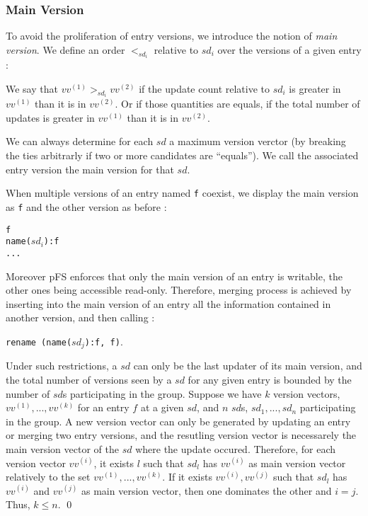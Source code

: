\subsubsection{Main Version}

To avoid the proliferation of entry versions, we introduce the notion
of \emph{main version}. We define an order $<_{sd_{i}}$ relative to
$sd_{i}$ over the versions of a given entry :

\begin{definition}
We say that $vv^{(1)} >_{sd_{i}} vv^{(2)}$ if the update count
relative to $sd_{i}$ is greater in $vv^{(1)}$ than it is in
$vv^{(2)}$. Or if those quantities are equals, if the total number
of updates is greater in $vv^{(1)}$ than it is in $vv^{(2)}$.
\end{definition}
 
We can always determine for each $sd$ a maximum version verctor (by
breaking the ties arbitrarly if two or more candidates are
``equals''). We call the associated entry version the main version for
that $sd$.

When multiple versions of an entry named {\tt f} coexist, we display
the main version as {\tt f} and the other version as before :
\begin{center}
  {\tt f} \\
  {\tt name($sd_{i}$):f} \\
  {\tt ...}
\end{center}
Moreover pFS enforces that only the main version of an entry is
writable, the other ones being accessible read-only.
Therefore, merging process is achieved by inserting into the main
version of an entry all the information contained in another version,
and then calling :
\begin{center}
{\tt rename (name($sd_{j}$):f, f)}.
\end{center}
Under such restrictions, a $sd$ can only be the last updater of its
main version, and the total number of versions seen by a $sd$ for any
given entry is bounded by the number of $sd$s participating in the group.
{\proof
Suppose we have $k$ version vectors, $vv^{(1)},..., vv^{(k)}$ for an
entry $f$ at a given $sd$, and $n$ $sd$s, $sd_{1}, ..., sd_{n}$
participating in the group. A new version vector can only be generated
by updating an entry or merging two entry versions, and the resutling
version vector is necessarely the main version vector of the $sd$
where the update occured. Therefore, for each version vector
$vv^{(i)}$, it exists $l$ such that $sd_{l}$ has $vv^{(i)}$ as main
version vector relatively to the set $vv^{(1)},..., vv^{(k)}$. If it
exists $vv^{(i)},vv^{(j)}$ such that $sd_{l}$ has $vv^{(i)}$ and
$vv^{(j)}$ as main version vector, then one dominates the other and
$i=j$. Thus, $k \leq n$. \qed
}


